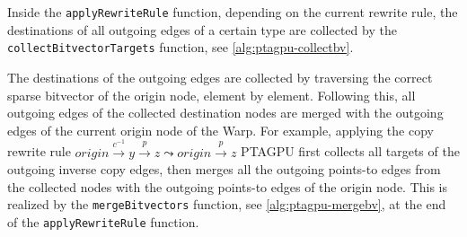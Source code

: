 Inside the \verb|applyRewriteRule| function, depending on the current rewrite rule, the destinations of all outgoing edges of a certain type are collected by the \verb|collectBitvectorTargets| function, see \autoref{alg:ptagpu-collectbv}.
The destinations of the outgoing edges are collected by traversing the correct sparse bitvector of the origin node, element by element.
Following this, all outgoing edges of the collected destination nodes are merged with the outgoing edges of the current origin node of the Warp.
For example, applying the copy rewrite rule $origin \xrightarrow{c^{-1}} y \xrightarrow{p} z \mathrel{\leadsto} origin \xrightarrow{p} z$ PTAGPU first collects all targets of the outgoing inverse copy edges, then merges all the outgoing points-to edges from the collected nodes with the outgoing points-to edges of the origin node.
This is realized by the \verb|mergeBitvectors| function, see \autoref{alg:ptagpu-mergebv}, at the end of the \verb|applyRewriteRule| function.
